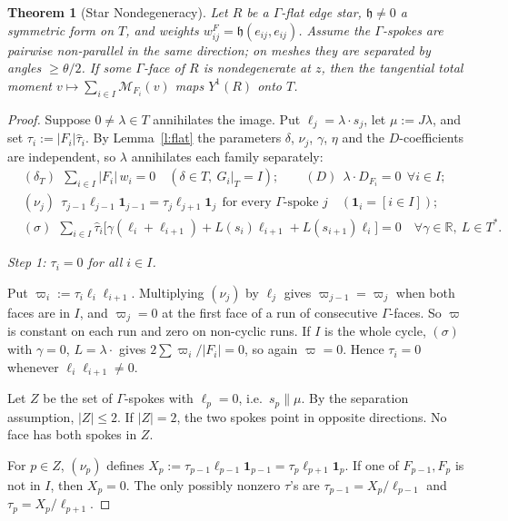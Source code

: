 \documentclass[11pt]{article}
\newtheorem{theorem}{Theorem}[section]
\theoremstyle{definition}
\newcommand{\R}{\mathbb R}
\newcommand{\M}{\mathcal M}
\newcommand{\hh}{\mathfrak h}
\begin{document}
\begin{theorem}[Star Nondegeneracy]\label{t:nondeg}
Let $R$ be a $\Gamma$-flat edge star, $\hh\ne0$ a symmetric form on $T$, and weights $w^F_{ij}=\hh(e_{ij},e_{ij})$. Assume the $\Gamma$-spokes are pairwise non-parallel in the same direction; on meshes they are separated by angles $\ge\theta/2$. If some $\Gamma$-face of $R$ is nondegenerate at $z$, then the tangential total moment $v\mapsto\sum_{i\in I}\M_{F_i}(v)$ maps $Y^1(R)$ onto $T$.
\end{theorem}
\begin{proof}
Suppose $0\ne\lambda\in T$ annihilates the image. Put $\ell_j=\lambda\cdot s_j$, let $\mu:=J\lambda$, and set $\tau_i:=|F_i|\hat\tau_i$. By Lemma~\ref{l:flat} the parameters $\delta$, $\nu_j$, $\gamma$, $\eta$ and the $D$-coefficients are independent, so $\lambda$ annihilates each family separately:
\begin{align*}
&(\delta_T)\ \ \textstyle\sum_{i\in I}|F_i|\,w_i=0 \quad(\delta\in T,\ G_i|_T=I);\qquad (D)\ \ \lambda\cdot D_{F_i}=0\ \ \forall i\in I;\\
&(\nu_j)\ \ \tau_{j-1}\ell_{j-1}\mathbf 1_{j-1}=\tau_j\ell_{j+1}\mathbf 1_j\ \ \text{for every $\Gamma$-spoke $j$}\quad(\mathbf 1_i=[i\in I]);\\
&(\sigma)\ \ \textstyle\sum_{i\in I}\hat\tau_i\bigl[\gamma(\ell_i+\ell_{i+1})+L(s_i)\ell_{i+1}+L(s_{i+1})\ell_i\bigr]=0\quad\forall\gamma\in\R,\ L\in T^\ast .
\end{align*}

\emph{Step 1: $\tau_i=0$ for all $i\in I$.}

Put $\varpi_i:=\tau_i\ell_i\ell_{i+1}$. Multiplying $(\nu_j)$ by $\ell_j$ gives $\varpi_{j-1}=\varpi_j$ when both faces are in $I$, and $\varpi_j=0$ at the first face of a run of consecutive $\Gamma$-faces. So $\varpi$ is constant on each run and zero on non-cyclic runs. If $I$ is the whole cycle, $(\sigma)$ with $\gamma=0$, $L=\lambda\cdot$ gives $2\sum\varpi_i/|F_i|=0$, so again $\varpi=0$. Hence $\tau_i=0$ whenever $\ell_i\ell_{i+1}\neq0$.

Let $Z$ be the set of $\Gamma$-spokes with $\ell_p=0$, i.e.\ $s_p\parallel\mu$. By the separation assumption, $|Z|\le2$. If $|Z|=2$, the two spokes point in opposite directions. No face has both spokes in $Z$.

For $p\in Z$, $(\nu_p)$ defines $X_p:=\tau_{p-1}\ell_{p-1}\mathbf 1_{p-1}=\tau_p\ell_{p+1}\mathbf 1_p$. If one of $F_{p-1},F_p$ is not in $I$, then $X_p=0$. The only possibly nonzero $\tau$'s are $\tau_{p-1}=X_p/\ell_{p-1}$ and $\tau_p=X_p/\ell_{p+1}$.


\end{proof}
\end{document}
